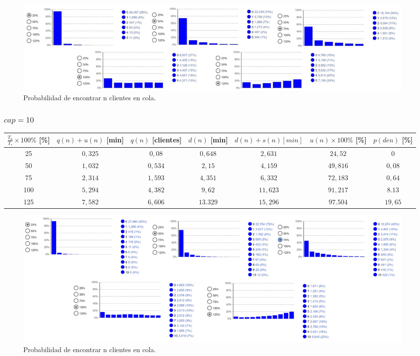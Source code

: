 \begin{figure}[H]
  \includegraphics[width=\linewidth]{images/anylogic-colas-5}
  \caption{Probabilidad de encontrar n clientes en cola.}
\end{figure}

\subsubsection[cap = 10]{$cap = 10$}

\begin{tabular}{||c||c|c|c|c|c|c||}
    \hline \hline
    $\frac{T_a}{T_s}\times100\%$ [\%] & $q(n)+u(n)$ [min] & $q(n)$ [clientes] & $d(n)$ [min] & $d(n)+s(n) [min]$ & $u(n)\times100\%$ [\%] & $p(den)$ [\%] \\
    \hline \hline
    25 & $0,325$ & $0,08$ & $0,648$ & $2,631$ & $24,52$ & $0$ \\
    \hline
    50 & $1,032$ & $0,534$ & $2,15$ & $4,159$ & $49,816$ & $0,08$ \\
    \hline
    75 & $2,314$ & $1,593$ & $4,351$ & $6,332$ & $72,183$ & $0,64$ \\
    \hline
    100 & $5,294$ & $4,382$ & $9,62$ & $11,623$ & $91,217$ & $8.13$ \\
    \hline
    125 & $7,582$ & $6,606$ & $13.329$ & $15,296$ & $97.504$ & $19,65$ \\
    \hline \hline
\end{tabular}

\begin{figure}[H]
  \includegraphics[width=\linewidth]{images/anylogic-colas-10}
  \caption{Probabilidad de encontrar n clientes en cola.}
\end{figure}

